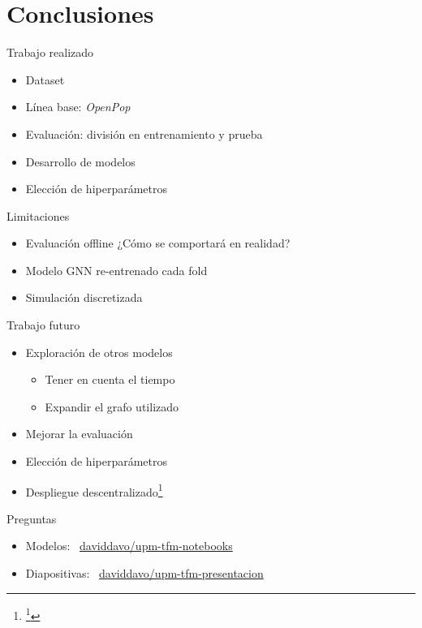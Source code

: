 \section{Conclusiones}

\begin{frame}{Trabajo realizado}
    \begin{itemize}
        \item Dataset
        \item Línea base: \textit{OpenPop}
        \item Evaluación: división en entrenamiento y prueba
        \item Desarrollo de modelos
        \item Elección de hiperparámetros
    \end{itemize}
\end{frame}

\begin{frame}{Limitaciones}
    \begin{itemize}
        \item Evaluación offline \textrightarrow ¿Cómo se comportará en realidad?
        \item Modelo GNN re-entrenado cada fold
        \item Simulación discretizada
    \end{itemize} 
\end{frame}

\begin{frame}{Trabajo futuro}
    \begin{itemize}
        \item Exploración de otros modelos
        \begin{itemize}
            \item Tener en cuenta el tiempo
            \item Expandir el grafo utilizado
        \end{itemize}
        \item Mejorar la evaluación
        \item Elección de hiperparámetros
        \item Despliegue descentralizado\footnote{\footcite{patel_graph_2024}}
    \end{itemize}
\end{frame}

\begingroup
{}
\begin{frame}{Preguntas}
    \vfill
    \begin{itemize}
        \item Modelos: \faGithub\ \href{https://github.com/daviddavo/upm-tfm-notebooks}{daviddavo/upm-tfm-notebooks}
        \item Diapositivas: \faGithub\ \href{https://github.com/daviddavo/upm-tfm-presentacion}{daviddavo/upm-tfm-presentacion}
    \end{itemize}
    \vfill
    \vspace{25mm}
    \doclicenseThis
\end{frame}
\endgroup

